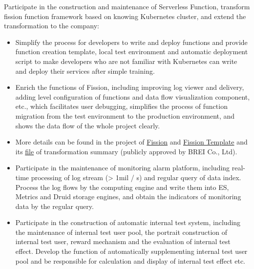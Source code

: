 \documentclass{resume}
\begin{document}
Participate in the construction and maintenance of Serverless Function, transform fission function framework based on knowing Kubernetes cluster, and extend the transformation to the company:
\begin{itemize}[topsep = 0 pt, partopsep = 0pt]
  \item Simplify the process for developers to write and deploy functions and provide function creation template, local test environment and automatic deployment script to make developers who are not familiar with Kubernetes can write and deploy their services after simple training.
  \item Enrich the functions of Fission, including improving log viewer and delivery, adding level configuration of functions and data flow visualization component, etc., which facilitates user debugging, simplifies the process of function migration from the test environment to the production environment, and shows the data flow of the whole project clearly.
  \item More details can be found in the project of \href{https://github.com/jingtaozhang18/fission}{Fission} and \href{https://github.com/jingtaozhang18/fission-template}{Fission Template} and its \href{https://jingtao.fun/%E6%BA%90%E7%A0%81-Fission%E5%8A%9F%E8%83%BD%E6%8B%93%E5%B1%95/}{file} of transformation summary (publicly approved by BREI Co., Ltd).
\end{itemize}

\begin{itemize}[topsep = 0 pt, partopsep = 0pt]
  \item Participate in the maintenance of monitoring alarm platform, including real-time processing of log stream (> 1mil / s) and regular query of data index. Process the log flows by the computing engine and write them into ES, Metrics and Druid storage engines, and obtain the indicators of monitoring data by the regular query.
  \item Participate in the construction of automatic internal test system, including the maintenance of internal test user pool, the portrait construction of internal test user, reward mechanism and the evaluation of internal test effect. Develop the function of automatically supplementing internal test user pool and be responsible for calculation and display of internal test effect etc.
\end{itemize}
\end{document}
